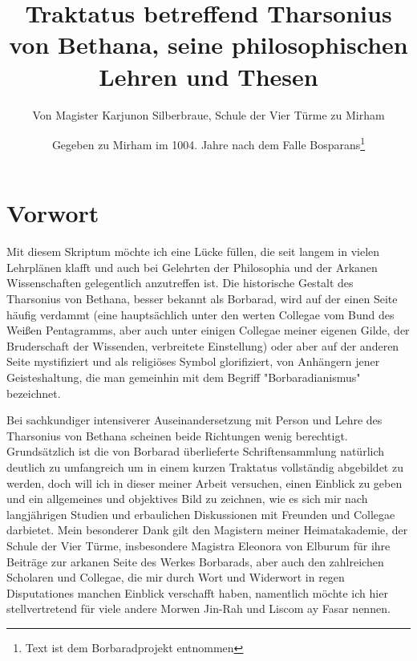 \documentclass[11pt]{article}
\title{Traktatus betreffend Tharsonius von Bethana, seine philosophischen Lehren und Thesen}
\author{Von Magister Karjunon Silberbraue, Schule der Vier Türme zu Mirham}
\date{Gegeben zu Mirham im 1004. Jahre nach dem Falle Bosparans\footnote{Text ist dem Borbaradprojekt entnommen}}
\begin{document}
\maketitle

\section{Vorwort}
Mit diesem Skriptum möchte ich eine Lücke füllen, die seit langem in vielen Lehrplänen klafft und auch
bei Gelehrten der Philosophia und der Arkanen Wissenschaften gelegentlich anzutreffen ist.
Die historische Gestalt des Tharsonius von Bethana, besser bekannt als Borbarad, wird auf der einen
Seite häufig verdammt (eine hauptsächlich unter den werten Collegae vom Bund des Weißen Pentagramms, aber auch unter einigen Collegae meiner eigenen Gilde, der Bruderschaft der Wissenden, verbreitete Einstellung) oder aber auf der anderen Seite mystifiziert und als religiöses Symbol glorifiziert,
von Anhängern jener Geisteshaltung, die man gemeinhin mit dem Begriff "Borbaradianismus" bezeichnet.

Bei sachkundiger intensiverer Auseinandersetzung mit Person und Lehre des Tharsonius von Bethana
scheinen beide Richtungen wenig berechtigt.
Grundsätzlich ist die von Borbarad überlieferte Schriftensammlung natürlich deutlich zu umfangreich um
in einem kurzen Traktatus vollständig abgebildet zu werden, doch will ich in dieser meiner Arbeit versuchen, einen Einblick zu geben und ein allgemeines und objektives Bild zu zeichnen, wie es sich mir nach
langjährigen Studien und erbaulichen Diskussionen mit Freunden und Collegae darbietet. Mein besonderer Dank gilt den Magistern meiner Heimatakademie, der Schule der Vier Türme, insbesondere Magistra
Eleonora von Elburum für ihre Beiträge zur arkanen Seite des Werkes Borbarads, aber auch den zahlreichen Scholaren und Collegae, die mir durch Wort und Widerwort in regen Disputationes manchen Einblick verschafft haben, namentlich möchte ich hier stellvertretend für viele andere Morwen Jin-Rah und
Liscom ay Fasar nennen.
\end{document}
